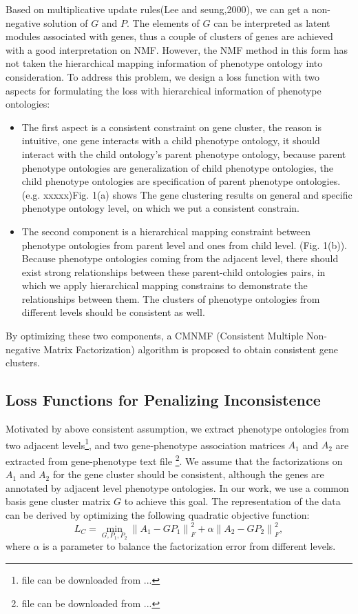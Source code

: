 \documentclass{bmcart}
\begin{document}
Based on multiplicative update rules(Lee and seung,2000), we can get a non-negative solution of $G$ and $P$. The elements of $G$ can be interpreted as latent modules associated with genes, thus a couple of clusters of genes are achieved with a good interpretation on NMF.
However, the NMF method in this form has not taken the hierarchical mapping information of phenotype ontology into consideration. To address this problem, we design a loss function with two aspects for formulating the loss with hierarchical information of phenotype ontologies:
\begin{itemize}
\item The first aspect is a consistent constraint on gene cluster, the reason is intuitive, one gene interacts with a child phenotype ontology, it should interact with the child ontology's parent phenotype ontology, because parent phenotype ontologies are generalization of child phenotype ontologies, the child phenotype ontologies are specification of parent phenotype ontologies. (e.g. xxxxx)Fig. 1(a) shows The gene clustering results on general and specific phenotype ontology level, on which we put a consistent constrain.
\item The second component is a hierarchical mapping constraint between phenotype ontologies from parent level and ones from child level. (Fig. 1(b)). Because phenotype ontologies coming from the adjacent level, there should exist strong relationships between these parent-child ontologies pairs, in which we apply hierarchical mapping constrains to demonstrate the relationships between them. The clusters of phenotype ontologies from different levels should be consistent as well.
\end{itemize}
By optimizing these two components, a CMNMF (Consistent Multiple Non-negative Matrix Factorization) algorithm is proposed to obtain consistent gene clusters.

\subsection*{Loss Functions for Penalizing Inconsistence}
Motivated by above consistent assumption, we extract phenotype ontologies from two adjacent levels\footnote{file can be downloaded from ...}, and two gene-phenotype association matrices $A_{1}$ and $A_{2}$ are extracted from gene-phenotype text file \footnote{file can be downloaded from ...}. We assume that the factorizations on  $A_{1}$ and $A_{2}$ for the gene cluster should be consistent, although the genes are annotated by adjacent level phenotype ontologies. In our work, we use a common basis gene cluster matrix $G$ to achieve this goal. The representation of the data can be derived by optimizing the following quadratic objective function:
\begin{equation}
{L_C} = \mathop {\min }\limits_{G,{P_1},{P_2}} \left\| {{A_1} - G{P_1}} \right\|_F^2 + \alpha \left\| {{A_2} - G{P_2}} \right\|_F^2,
\end{equation}
where $\alpha$ is a parameter to balance the factorization error from different levels.
\end{document}
